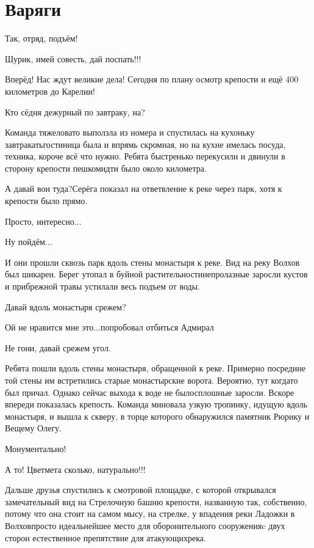 \chapter{Варяги}
\vepsianrose
\fancyhead[LE]{\fancyplain{}{\bfseries \parttitle}}
\fancyhead[RO]{\fancyplain{}{\bfseries \rightmark}}

\diagdash Так, отряд, подъём!

\diagdash Шурик, имей совесть, дай поспать!!!

\diagdash Вперёд! Нас ждут великие дела! Сегодня по плану осмотр крепости и ещё 400 километров до Карелии!

\diagdash Кто сёдня дежурный по завтраку, на?

Команда тяжеловато выползла из номера и спустилась на кухоньку завтракать\mdash гостиница была и впрямь скромная, но на кухне имелась посуда, техника, короче всё что нужно. Ребята быстренько перекусили и двинули в сторону крепости пешком\mdash идти было около километра.

\diagdash А давай вон туда?\mdash Серёга показал на ответвление к реке через парк, хотя к крепости было прямо.

\diagdash Просто, интересно$\ldots$

\diagdash Ну пойдём$\ldots$

И они прошли сквозь парк вдоль стены монастыря к реке. Вид на реку Волхов был шикарен. Берег утопал в буйной растительности\mdash непролазные заросли кустов и прибрежной травы устилали весь подъем от воды. 

\mdash Давай вдоль монастыря срежем?

\mdash Ой не нравится мне это$\ldots$\mdash попробовал отбиться Адмирал

\mdash Не гони, давай срежем угол.

Ребята пошли вдоль стены монастыря, обращенной к реке. Примерно посредине той стены им встретились старые монастырские ворота. Вероятно, тут когда\sdash то был причал. Однако сейчас выхода к воде не было\mdash сплошные заросли. Вскоре впереди показалась крепость. Команда миновала узкую тропинку, идущую вдоль монастыря, и вышла к скверу, в торце которого обнаружился памятник Рюрику и Вещему Олегу. 

\diagdash Монументально!

\diagdash А то! Цветмета сколько, натурально!!!

Дальше друзья спустились к смотровой площадке, с которой открывался замечательный вид на Стрелочную башню крепости, названную так, собственно, потому что она стоит на самом мысу, на стрелке, у впадения реки Ладожки в Волхов\mdash просто идеальнейшее место для оборонительного сооружения\mdash c двух сторон естественное препятствие для атакующих\mdash река.

